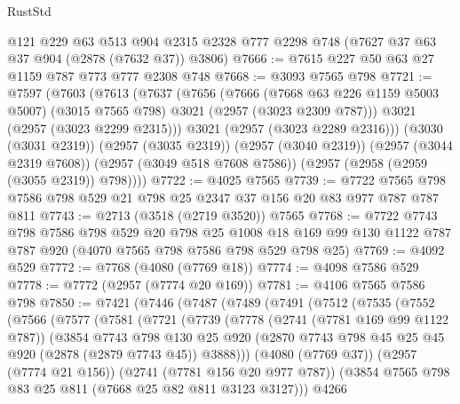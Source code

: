 \begin{lexlean}{RustStd}
\begin{coremodule}
    @121
    @229
    @63
    @513
    @904
    @2315
    @2328
    @777
    @2298
    @748
    (@7627 @37 @63 @37 @904 (@2878 (@7632 @37)) @3806)
@7666 := @7615 @227 @50 @63 @27 @1159 @787 @773 @777 @2308 @748
@7668 := @3093 @7565 @798
@7721 := @7597
    (@7603
      (@7613
        (@7637
          (@7656
            (@7666
              (@7668 @63 @226 @1159 @5003 @5007)
              (@3015 @7565 @798)
              @3021
              (@2957 (@3023 @2309 @787)))
            @3021
            (@2957 (@3023 @2299 @2315)))
          @3021
          (@2957 (@3023 @2289 @2316)))
        (@3030 (@3031 @2319))
        (@2957 (@3035 @2319))
        (@2957 (@3040 @2319))
        (@2957 (@3044 @2319 @7608))
        (@2957 (@3049 @518 @7608 @7586))
        (@2957 (@2958 (@2959 (@3055 @2319)) @798))))
@7722 := @4025 @7565
@7739 := @7722 @7565 @798 @7586 @798 @529 @21 @798 @25 @2347 @37 @156 @20 @83 @977 @787 @787 @811
@7743 := @2713 (@3518 (@2719 @3520)) @7565
@7768 := @7722
    @7743
    @798
    @7586
    @798
    @529
    @20
    @798
    @25
    @1008
    @18
    @169
    @99
    @130
    @1122
    @787
    @787
    @920
    (@4070 @7565 @798 @7586 @798 @529 @798 @25)
@7769 := @4092 @529
@7772 := @7768 (@4080 (@7769 @18))
@7774 := @4098 @7586 @529
@7778 := @7772 (@2957 (@7774 @20 @169))
@7781 := @4106 @7565 @7586 @798
@7850 := @7421
    (@7446
      (@7487
        (@7489
          (@7491
            (@7512
              (@7535
                (@7552
                  (@7566
                    (@7577
                      (@7581
                        (@7721
                          (@7739
                            (@7778
                              (@2741 (@7781 @169 @99 @1122 @787))
                              (@3854
                                @7743
                                @798
                                @130
                                @25
                                @920
                                (@2870
                                  @7743
                                  @798
                                  @45
                                  @25
                                  @45
                                  @920
                                  (@2878 (@2879 @7743 @45))
                                  @3888)))
                            (@4080 (@7769 @37))
                            (@2957 (@7774 @21 @156))
                            (@2741 (@7781 @156 @20 @977 @787))
                            (@3854 @7565 @798 @83 @25 @811 (@7668 @25 @82 @811 @3123 @3127)))
                          @4266

\end{coremodule}
\end{lexlean}
